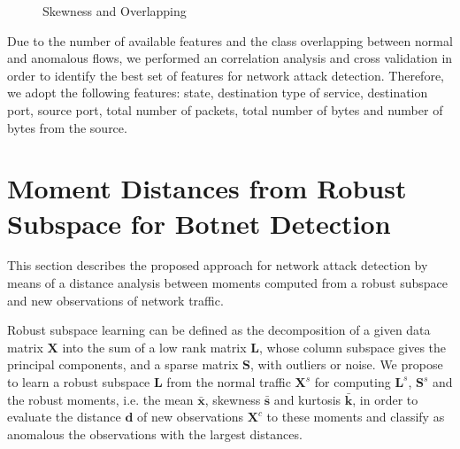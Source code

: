 \begin{figure}[!htb]
	\centering
	\caption[Skewness and Overlapping]{Skewness and Overlapping}
	\label{fig:4.09}
\end{figure}

Due to the number of available features and the class overlapping between normal and anomalous flows, we performed an correlation analysis and cross validation in order to identify the best set of features for network attack detection. Therefore, we adopt the following features: state, destination type of service, destination port, source port, total number of packets, total number of bytes and number of bytes from the source.

\section{Moment Distances from Robust Subspace for Botnet Detection}
\label{sec:4_proposal}

This section describes the proposed approach for network attack detection by means of a distance analysis between moments computed from a robust subspace and new observations of network traffic. 

Robust subspace learning can be defined as the decomposition of a given data matrix $\textbf{X}$ into the sum of a low rank matrix $\textbf{L}$, whose column subspace gives the principal components, and a sparse matrix $\textbf{S}$, with outliers or noise. We propose to learn a robust subspace $\textbf{L}$ from the normal traffic $\textbf{X}^s$ for computing $\textbf{L}^s$, $\textbf{S}^s$ and the robust moments, i.e. the mean $\boldsymbol{\bar{x}}$, skewness $\boldsymbol{\bar{s}}$ and kurtosis $\boldsymbol{\bar{k}}$, in order to evaluate the distance $\boldsymbol{d}$ of new observations $\boldsymbol{X}^c$ to these moments and classify as anomalous the observations with the largest distances.

